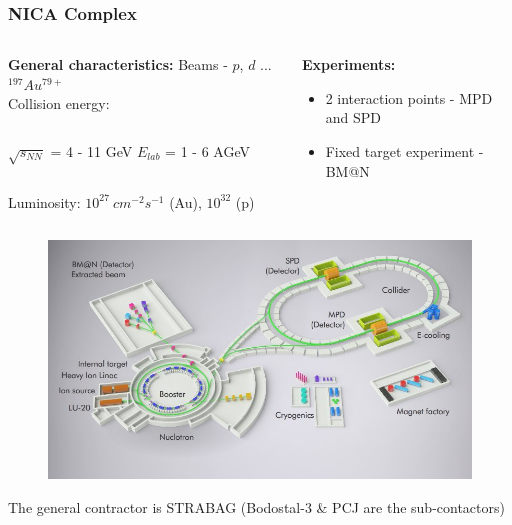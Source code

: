 \documentclass[dvipsnames] {beamer}
\begin{document}
\begin{frame}[shrink=40]
  \bf
  \frametitle{NICA Complex}
  \begin{columns}[c]
    \begin{block}{\centering \bf General characteristics:}
      \centering  Beams - {\color{red}$p$, $d$ ... $^{197}Au^{79+}$} \\
      \centering  Collision energy: 
      \begin{columns}[c]
        $\sqrt{s_{NN}}$ = {\color{red} 4 - 11} GeV
        $E_{lab}$ =  {\color{red}1 - 6} AGeV
      \end{columns}
      Luminosity: {\color{red}$10^{27}~cm^{-2}s^{-1}$} (Au), {\color{red}$10^{32}$} (p)

    \end{block}
    \begin{block}{\centering \bf Experiments:}
      \begin{itemize}
      \item 2 interaction points - {\color{red}MPD} and  {\color{red}SPD}
      \item Fixed target experiment -  {\color{red}BM@N}
      \end{itemize}
    \end{block}
  \end{columns}
  \begin{columns}[c]
    \begin{block}{}
      \begin{figure}[H]
        \includegraphics[width=1.\linewidth]{nica_complex1.png}
      \end{figure}
      \centering The general contractor is  {\color{red} STRABAG} (Bodostal-3 \& PCJ are the sub-contactors)

\end{block}
\end{columns}
\end{frame}
\end{document}
